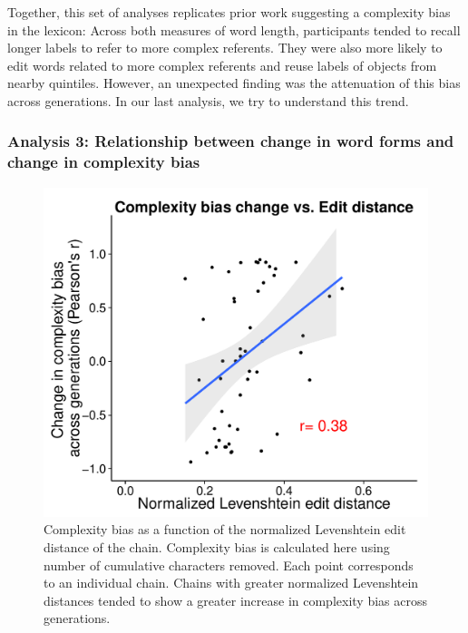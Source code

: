 Together, this set of analyses replicates prior work suggesting a complexity bias in the lexicon: Across both measures of word length, participants tended to recall longer labels to refer to more complex referents. They were also more likely to edit words related to more complex referents and reuse labels of objects from nearby quintiles. However, an unexpected finding was the attenuation of this bias across generations. In our last analysis, we try to understand this trend.


  
\subsubsection{Analysis  3: Relationship between change in word forms and change in complexity bias} 


\begin{figure}[t]
\begin{center}
\includegraphics[width = .8\linewidth]{figs/change_plot.pdf}
\end{center}
\vspace{-.5em}
\caption{Complexity bias as a function of the normalized Levenshtein edit distance of the chain. Complexity bias is calculated here using number of cumulative characters removed. Each point corresponds to an individual chain. Chains with greater normalized Levenshtein distances tended to show a greater increase in complexity bias across generations.}
\vspace{-1.5em}
\label{fig:levcbias}
\end{figure}



